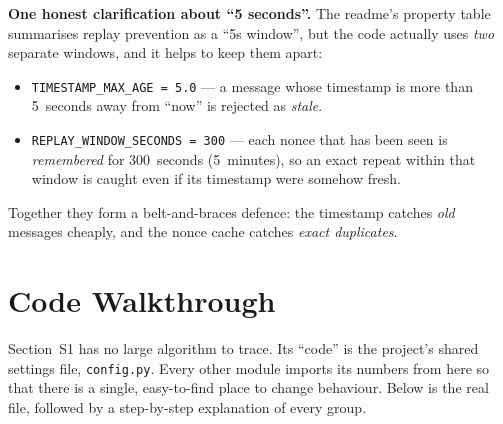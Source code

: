 \documentclass[11pt,a4paper]{report}
\begin{document}
\textbf{One honest clarification about ``5 seconds''.} The readme's property
table summarises replay prevention as a ``5s window'', but the code actually
uses \emph{two} separate windows, and it helps to keep them apart:
\begin{itemize}
  \item \texttt{TIMESTAMP\_MAX\_AGE = 5.0} --- a message whose timestamp is more
        than 5~seconds away from ``now'' is rejected as \emph{stale}.
  \item \texttt{REPLAY\_WINDOW\_SECONDS = 300} --- each nonce that has been seen
        is \emph{remembered} for 300~seconds (5~minutes), so an exact repeat
        within that window is caught even if its timestamp were somehow fresh.
\end{itemize}
Together they form a belt-and-braces defence: the timestamp catches \emph{old}
messages cheaply, and the nonce cache catches \emph{exact duplicates}.

\section{Code Walkthrough}

Section~S1 has no large algorithm to trace. Its ``code'' is the project's
shared settings file, \texttt{config.py}. Every other module imports its numbers
from here so that there is a single, easy-to-find place to change behaviour.
Below is the real file, followed by a step-by-step explanation of every group.
\end{document}
